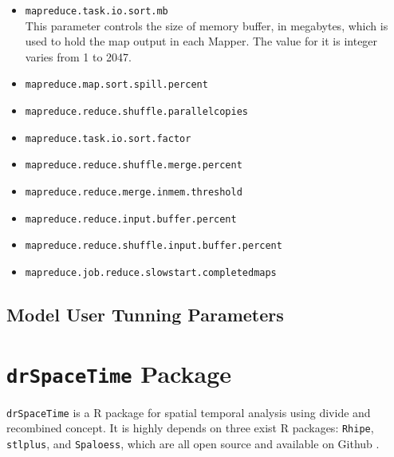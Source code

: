 \begin{itemize}
\item \texttt{mapreduce.task.io.sort.mb} \\
This parameter controls the size of memory buffer, in megabytes, which is used 
to hold the map output in each Mapper. The value for it is integer varies from 1 
to 2047. 

\item \texttt{mapreduce.map.sort.spill.percent}

\item \texttt{mapreduce.reduce.shuffle.parallelcopies}

\item \texttt{mapreduce.task.io.sort.factor}

\item \texttt{mapreduce.reduce.shuffle.merge.percent}

\item \texttt{mapreduce.reduce.merge.inmem.threshold}

\item \texttt{mapreduce.reduce.input.buffer.percent}

\item \texttt{mapreduce.reduce.shuffle.input.buffer.percent}

\item \texttt{mapreduce.job.reduce.slowstart.completedmaps}

\end{itemize}


\subsection{Model User Tunning Parameters}


\section{\texttt{drSpaceTime} Package}

\texttt{drSpaceTime} is a R package for spatial temporal analysis using divide 
and recombined concept. It is highly depends on three exist R packages: 
\texttt{Rhipe}, \texttt{stlplus}, and \texttt{Spaloess}, which are all open 
source and available on Github \cite{github}.